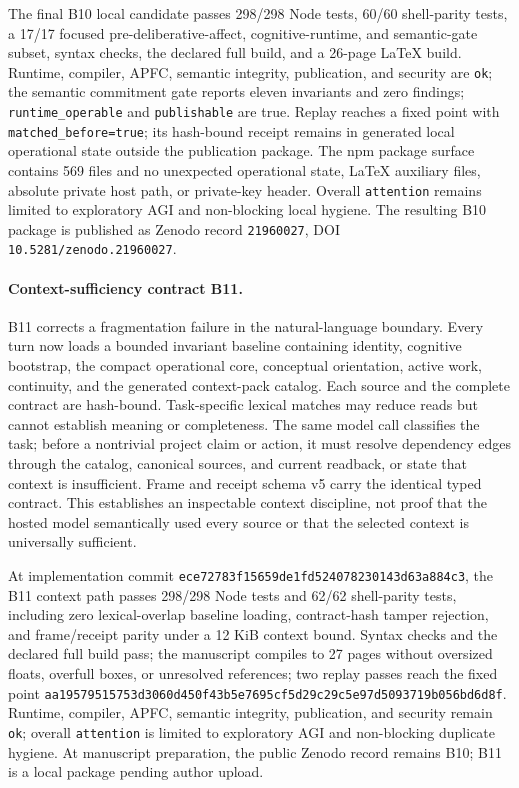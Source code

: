\documentclass[10pt,twocolumn]{article}
\theoremstyle{definition}
\theoremstyle{plain}
\theoremstyle{remark}
\newcommand{\file}[1]{\nolinkurl{#1}}
\newcommand{\contextrevision}{\textsf{B11}}
\begin{document}
The final B10 local candidate passes 298/298 Node tests, 60/60 shell-parity tests, a 17/17 focused pre-deliberative-affect, cognitive-runtime, and semantic-gate subset, syntax checks, the declared full build, and a 26-page LaTeX build.  Runtime, compiler, APFC, semantic integrity, publication, and security are \file{ok}; the semantic commitment gate reports eleven invariants and zero findings; \file{runtime\_operable} and \file{publishable} are true.  Replay reaches a fixed point with \file{matched\_before=true}; its hash-bound receipt remains in generated local operational state outside the publication package.  The npm package surface contains 569 files and no unexpected operational state, LaTeX auxiliary files, absolute private host path, or private-key header.  Overall \file{attention} remains limited to exploratory AGI and non-blocking local hygiene.  The resulting B10 package is published as Zenodo record \file{21960027}, DOI \file{10.5281/zenodo.21960027}.

\paragraph{Context-sufficiency contract \contextrevision.}
B11 corrects a fragmentation failure in the natural-language boundary.  Every turn now loads a bounded invariant baseline containing identity, cognitive bootstrap, the compact operational core, conceptual orientation, active work, continuity, and the generated context-pack catalog.  Each source and the complete contract are hash-bound.  Task-specific lexical matches may reduce reads but cannot establish meaning or completeness.  The same model call classifies the task; before a nontrivial project claim or action, it must resolve dependency edges through the catalog, canonical sources, and current readback, or state that context is insufficient.  Frame and receipt schema v5 carry the identical typed contract.  This establishes an inspectable context discipline, not proof that the hosted model semantically used every source or that the selected context is universally sufficient.

At implementation commit \file{ece72783f15659de1fd524078230143d63a884c3}, the B11 context path passes 298/298 Node tests and 62/62 shell-parity tests, including zero lexical-overlap baseline loading, contract-hash tamper rejection, and frame/receipt parity under a 12 KiB context bound.  Syntax checks and the declared full build pass; the manuscript compiles to 27 pages without oversized floats, overfull boxes, or unresolved references; two replay passes reach the fixed point \file{aa19579515753d3060d450f43b5e7695cf5d29c29c5e97d5093719b056bd6d8f}.  Runtime, compiler, APFC, semantic integrity, publication, and security remain \file{ok}; overall \file{attention} is limited to exploratory AGI and non-blocking duplicate hygiene.  At manuscript preparation, the public Zenodo record remains B10; B11 is a local package pending author upload.
\end{document}

